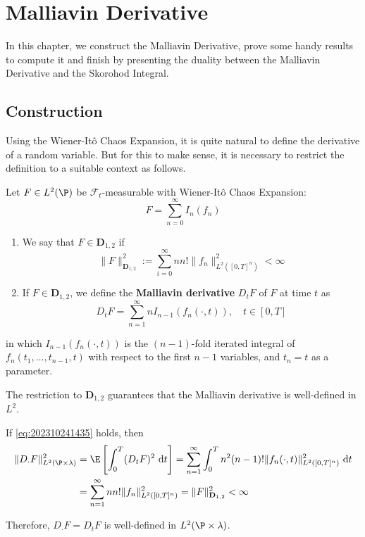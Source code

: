 \chapter{Malliavin Derivative} 

In this chapter, we construct the Malliavin Derivative, prove some handy results to compute it and finish by presenting the duality between the Malliavin Derivative and the Skorohod Integral.

\section{Construction}

Using the Wiener-Itô Chaos Expansion, it is quite natural to define the derivative of a random variable. But for this to make sense, it is necessary to restrict the definition to a suitable context as follows.

\begin{definition}
Let $F \in L^2(\P)$ be $\mathcal{F}_t$-measurable with Wiener-Itô Chaos Expansion:
$$
F = \sum_{n=0}^\infty I_n(f_n)
$$

\begin{enumerate}
\item We say that $F \in \mathbf{D}_{1,2}$ if 
\begin{equation}\label{eq:202310241435} 
\| F \|_{\mathbf{D}_{1,2}}^2 := \sum_{i=0}^\infty n n! \| f_n \|_{L^2([0,T]^n)}^2 < \infty
\end{equation}

\item If $F \in \mathbf{D}_{1,2}$, we define the \textbf{Malliavin derivative} $D_t F$ of $F$ at time $t$ as 
\begin{equation}\label{eq:202310241436}
D_t F = \sum_{n=1}^\infty n I_{n-1}(f_n(\cdot, t)), \quad t \in [0,T]
\end{equation} 
\end{enumerate}
in which $I_{n-1}(f_n(\cdot, t))$ is the $(n-1)$-fold iterated integral of $f_n(t_1, \ldots, t_{n-1}, t)$ with respect to the first $n-1$ variables, and $t_n = t$ as a parameter. 
\end{definition}

The restriction to $\mathbf{D}_{1,2}$ guarantees that the Malliavin derivative is well-defined in $L^2$.

\begin{remark}
If \eqref{eq:202310241435} holds, then 
\begin{equation*}
	\begin{aligned}
		\| D_\cdot F \|_{L^2(\P \times \lambda)}^2 &= \E \left[ \int_0^T (D_t F)^2 ~\mathrm{d}t \right] = \sum_{n=1}^\infty \int_0^T n^2 (n-1)! \| f_n(\cdot, t) \|_{L^2([0,T]^n)}^2 ~\mathrm{d}t \\
		&= \sum_{n=1}^\infty n n! \| f_n \|_{L^2([0,T]^n)}^2 = \| F \|_{\mathbf{D}_{1,2}}^2 < \infty
	\end{aligned}
\end{equation*} 

Therefore, $D_\cdot F = D_t F$ is well-defined in $L^2(\P \times \lambda)$.
\end{remark}

